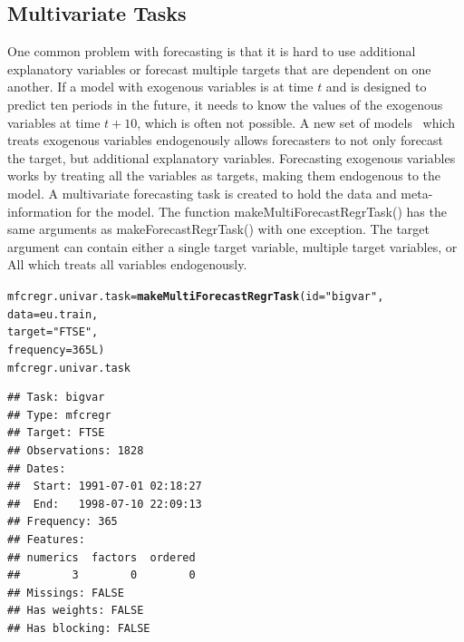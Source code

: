 \documentclass[12pt]{article}\usepackage[]{graphicx}\usepackage[]{color}
\makeatletter
\newcommand{\hlnum}[1]{\textcolor[rgb]{0.686,0.059,0.569}{#1}}%
\newcommand{\hlstr}[1]{\textcolor[rgb]{0.192,0.494,0.8}{#1}}%
\newcommand{\hlstd}[1]{\textcolor[rgb]{0.345,0.345,0.345}{#1}}%
\newcommand{\hlkwb}[1]{\textcolor[rgb]{0.69,0.353,0.396}{#1}}%
\newcommand{\hlkwc}[1]{\textcolor[rgb]{0.333,0.667,0.333}{#1}}%
\newcommand{\hlkwd}[1]{\textcolor[rgb]{0.737,0.353,0.396}{\textbf{#1}}}%
\newenvironment{kframe}{%
 \def\at@end@of@kframe{}%
 \ifinner\ifhmode%
  \def\at@end@of@kframe{\end{minipage}}%
  \begin{minipage}{\columnwidth}%
 \fi\fi%
 \def\FrameCommand##1{\hskip\@totalleftmargin \hskip-\fboxsep
 \colorbox{shadecolor}{##1}\hskip-\fboxsep
     \hskip-\linewidth \hskip-\@totalleftmargin \hskip\columnwidth}%
 \MakeFramed {\advance\hsize-\width
   \@totalleftmargin\z@ \linewidth\hsize
   \@setminipage}}%
 {\par\unskip\endMakeFramed%
 \at@end@of@kframe}
\newenvironment{knitrout}{}{} %
\theoremstyle{definition}
\newcommand\code{\@codex}
\def\@codex#1{{\normalfont\ttfamily\hyphenchar\font=-1 #1}}
\makeatother
\begin{document}
\subsection{Multivariate Tasks}
\label{sec:multivarTask}

One common problem with forecasting is that it is hard to use additional explanatory variables or forecast multiple targets that are dependent on one another. If a model with exogenous variables is at time $t$ and is designed to predict ten periods in the future, it needs to know the values of the exogenous variables at time $t+10$, which is often not possible. A new set of models~\cite{BigVAR} which treats exogenous variables endogenously allows forecasters to not only forecast the target, but additional explanatory variables. Forecasting exogenous variables works by treating all the variables as targets, making them endogenous to the model. A multivariate forecasting task is created to hold the data and meta-information for the model. The function \code{makeMultiForecastRegrTask()} has the same arguments as \code{makeForecastRegrTask()} with one exception. The \code{target} argument can contain either a single target variable, multiple target variables, or \code{All} which treats all variables endogenously.

\singlespacing
\begin{knitrout}
\color{fgcolor}\begin{kframe}
\begin{alltt}
\hlstd{mfcregr.univar.task} \hlkwb{=} \hlkwd{makeMultiForecastRegrTask}\hlstd{(}\hlkwc{id} \hlstd{=} \hlstr{"bigvar"}\hlstd{,}
                                         \hlkwc{data} \hlstd{= eu.train,}
                                         \hlkwc{target} \hlstd{=} \hlstr{"FTSE"}\hlstd{,}
                                         \hlkwc{frequency} \hlstd{=} \hlnum{365L}\hlstd{)}
\hlstd{mfcregr.univar.task}
\end{alltt}
\begin{verbatim}
## Task: bigvar
## Type: mfcregr
## Target: FTSE
## Observations: 1828
## Dates:
##  Start: 1991-07-01 02:18:27 
##  End:   1998-07-10 22:09:13
## Frequency: 365
## Features:
## numerics  factors  ordered 
##        3        0        0 
## Missings: FALSE
## Has weights: FALSE
## Has blocking: FALSE
\end{verbatim}
\end{kframe}
\end{knitrout}
\doublespacing
\end{document}
